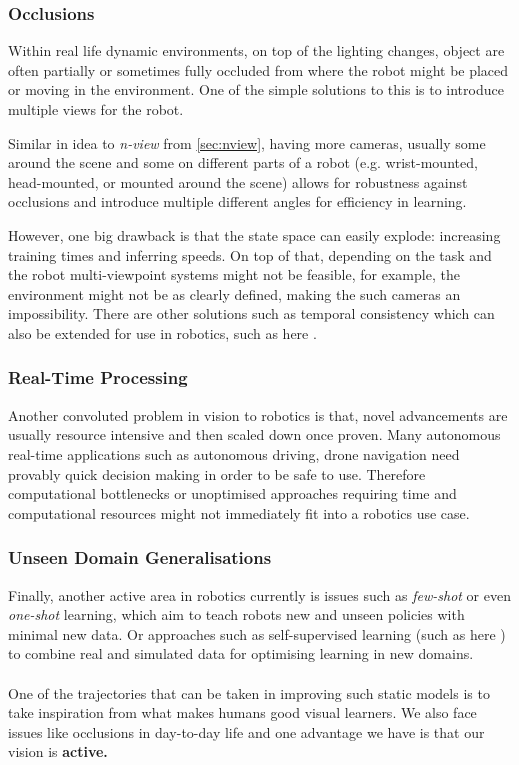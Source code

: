     \subsubsection{Occlusions}
      Within real life dynamic environments, on top of the lighting changes, object are often partially or sometimes fully occluded from where the robot might be placed or moving in the environment.  One of the simple solutions to this is to introduce multiple views for the robot. 
      
      Similar in idea to \emph{n-view} from \ref{sec:nview}, having more cameras, usually some around the scene and some on different parts of a robot (e.g. wrist-mounted, head-mounted, or mounted around the scene) allows for robustness against occlusions and introduce multiple different angles for efficiency in learning. 

      However, one big drawback is that the state space can easily explode: increasing training times and inferring speeds. On top of that, depending on the task and the robot multi-viewpoint systems might not be feasible, for example, the environment might not be as clearly defined, making the such cameras an impossibility. There are other solutions such as temporal consistency \cite{lai2018learningblindvideotemporal} which can also be extended for use in robotics, such as here \cite{billington2007using, yang2021reactive}.

    \subsubsection{Real-Time Processing}
    Another convoluted problem in vision to robotics is that, novel advancements are usually resource intensive and then scaled down once proven. Many autonomous real-time  applications such as autonomous driving, drone navigation need provably quick decision making in order to be safe to use. Therefore computational bottlenecks or unoptimised approaches requiring time and computational resources might not immediately fit into a robotics use case.

    \subsubsection{Unseen Domain Generalisations}
    Finally, another active area in robotics currently is issues such as \emph{few-shot} or even \emph{one-shot} learning, which aim to teach robots new and unseen policies with minimal new data. Or approaches such as self-supervised learning (such as here \cite{lim2022real2sim2real, huang2021robot}) to combine real and simulated data for optimising learning in new domains.
    \\\\
    One of the trajectories that can be taken in improving such static models is to take inspiration from what makes humans good visual learners. We also face issues like occlusions in day-to-day life and one advantage we have is that our vision is \textbf{active.}
    
  

    